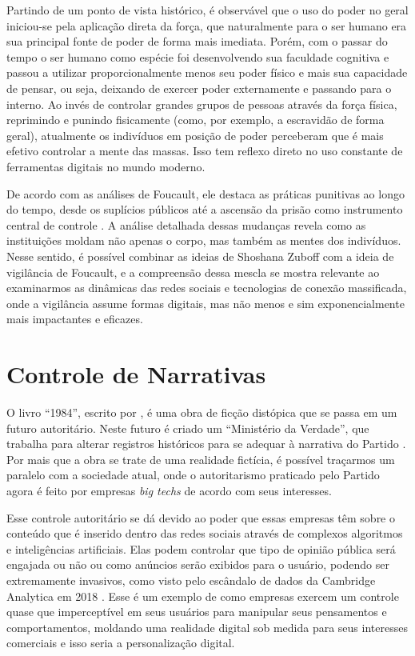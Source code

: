 \documentclass[
	12pt,
	openright,
	twoside,
	a4paper,
	english,
	french,
	spanish,
	brazil
]{abntex2}
\begin{document}
  Partindo de um ponto de vista histórico, é observável que o uso do poder no
  geral iniciou-se pela aplicação direta da força, que naturalmente para o ser
  humano era sua principal fonte de poder de forma mais imediata. Porém, com o
  passar do tempo o ser humano como espécie foi desenvolvendo sua faculdade
  cognitiva e passou a utilizar proporcionalmente menos seu poder físico e mais
  sua capacidade de pensar, ou seja, deixando de exercer poder externamente e
  passando para o interno. Ao invés de controlar grandes grupos de pessoas
  através da força física, reprimindo e punindo fisicamente (como, por exemplo,
  a escravidão de forma geral), atualmente os indivíduos em posição de poder
  perceberam que é mais efetivo controlar a mente das massas. Isso tem reflexo
  direto no uso constante de ferramentas digitais no mundo moderno.

  De acordo com as análises de Foucault, ele destaca as práticas punitivas ao
  longo do tempo, desde os suplícios públicos até a ascensão da prisão como
  instrumento central de controle \cite{foucault-vigiar-punir}. A análise
  detalhada dessas mudanças revela como as instituições moldam não apenas o
  corpo, mas também as mentes dos indivíduos. Nesse sentido, é possível combinar
  as ideias de Shoshana Zuboff com a ideia de vigilância de Foucault, e a
  compreensão dessa mescla se mostra relevante ao examinarmos as dinâmicas das
  redes sociais e tecnologias de conexão massificada, onde a vigilância assume
  formas digitais, mas não menos e sim exponencialmente mais impactantes e
  eficazes.


  \chapter{Controle de Narrativas}

  O livro ``1984'', escrito por , é uma obra de
  ficção distópica que se passa em um futuro autoritário. Neste futuro é criado
  um ``Ministério da Verdade'', que trabalha para alterar registros históricos
  para se adequar à narrativa do Partido \cite{orwell-1984}. Por mais que a obra
  se trate de uma realidade fictícia, é possível traçarmos um paralelo com a
  sociedade atual, onde o autoritarismo praticado pelo Partido agora é feito por
  empresas \textit{big techs} de acordo com seus interesses.

  Esse controle autoritário se dá devido ao poder que essas empresas têm sobre o
  conteúdo que é inserido dentro das redes sociais através de complexos
  algoritmos e inteligências artificiais. Elas podem controlar que tipo de
  opinião pública será engajada ou não ou como anúncios serão exibidos para o
  usuário, podendo ser extremamente invasivos, como visto pelo escândalo de
  dados da Cambridge Analytica em 2018 \cite{chan-cambridge-analytica}. Esse é
  um exemplo de como empresas exercem um controle quase que imperceptível em
  seus usuários para manipular seus pensamentos e comportamentos, moldando uma
  realidade digital sob medida para seus interesses comerciais e isso seria a
  personalização digital.
\end{document}
